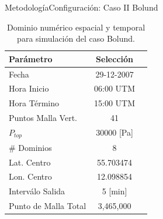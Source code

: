 \documentclass[mathserif,10pt]{beamer}
\begin{document}
\begin{frame}{Metodología}{Configuración: Caso II Bolund}
	\begin{table}[h!]
		\caption{Dominio numérico espacial y temporal para simulación del caso Bolund.}\label{tab:05_config_bol}
		\centering\footnotesize
		\begin{tabular}{lcc}
			\toprule
			Parámetro & Selección \\
			\midrule
			Fecha	 	 & 29-12-2007   \\
			Hora Inicio	 	 & 06:00 UTM\\
			Hora Término	 		 & 15:00 UTM\\
			Puntos Malla Vert.	 	 & 41   \\
			$P_{top}$ 	& 30000 [Pa]\\
			\# Dominios	& 8   \\
			Lat. Centro	& 55.703474   \\
			Lon. Centro	& 12.098854   \\
			Interválo Salida & 5 [min]\\
			Punto de Malla Total & 3,465,000\\
			\bottomrule
		\end{tabular}
	\end{table}
\end{frame}
\end{document}
